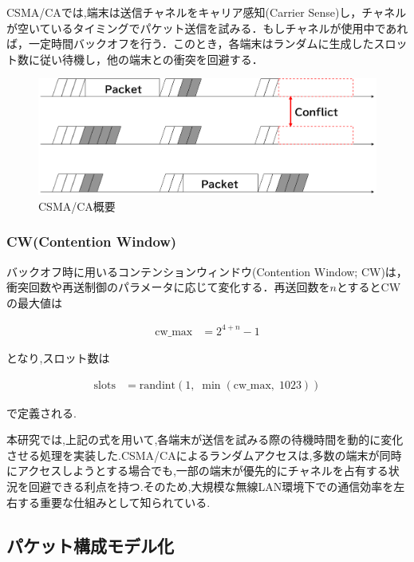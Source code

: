 \documentclass[a4paper, 10pt]{ltjsarticle}
\begin{document}
CSMA/CAでは,端末は送信チャネルをキャリア感知(Carrier Sense)し，チャネルが空いているタイミングでパケット送信を試みる．もしチャネルが使用中であれば，一定時間バックオフを行う．このとき，各端末はランダムに生成したスロット数に従い待機し，他の端末との衝突を回避する．


\begin{figure}[H]
  \centering
  \includegraphics[width=1\columnwidth]{./assets/csmaca-1.png}
  \caption{CSMA/CA概要}
  \label{CSMA/CA}
\end{figure}

\subsubsection{CW(Contention Window)}
バックオフ時に用いるコンテンションウィンドウ(Contention Window; CW)は，衝突回数や再送制御のパラメータに応じて変化する．再送回数を$n$とするとCWの最大値は



\begin{align}
  \text{cw\_max} &= 2^{4 + n} - 1
\end{align}

となり,スロット数は

\begin{align}
  \text{slots} &= \mathrm{randint}(1, \; \min(\text{cw\_max}, \; 1023))
\end{align}

で定義される.

本研究では,上記の式を用いて,各端末が送信を試みる際の待機時間を動的に変化させる処理を実装した.CSMA/CAによるランダムアクセスは,多数の端末が同時にアクセスしようとする場合でも,一部の端末が優先的にチャネルを占有する状況を回避できる利点を持つ.そのため,大規模な無線LAN環境下での通信効率を左右する重要な仕組みとして知られている.


\subsection{パケット構成モデル化}
\end{document}
